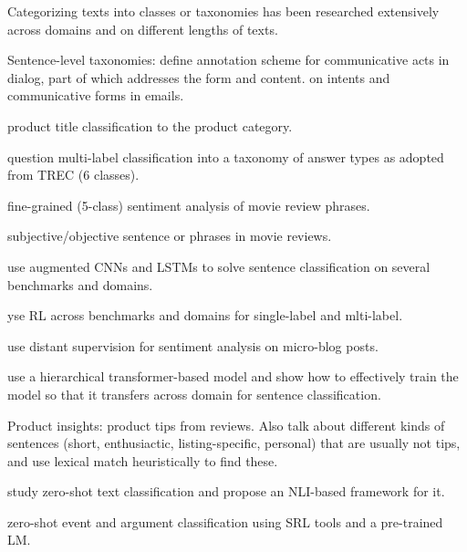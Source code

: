 

Categorizing texts into classes or taxonomies has been researched extensively across domains and on different lengths of texts.

Sentence-level taxonomies:
\citep{core1997dialog_annotation, jurafsky1997discourse_structure} define annotation scheme for communicative acts in dialog, part of which addresses the form and content. \citep{khoo2006email_classification} on intents and communicative forms in emails.

\citep{yu2012product_title_categories} product title classification to the product category.

\citep{li2002question_classification} question multi-label classification into a taxonomy of answer types as adopted from TREC (6 classes).

\citep[SST][]{socher2013finegrained_sentiment} fine-grained (5-class) sentiment analysis of movie review phrases.

\citep{pang2004subjective_reviews} subjective/objective sentence or phrases in movie reviews.

\citep{guo2019sentence_classification_dl} use augmented CNNs and LSTMs to solve sentence classification on several benchmarks and domains.

\citep{chai2020rl_classification} yse RL across benchmarks and domains for single-label and mlti-label.

\citep{go2009sentiment_distant} use distant supervision for sentiment analysis on micro-blog posts.

\citep{Brack2022classification_transfer} use a hierarchical transformer-based \citep{beltagy2019scibert} model and show how to effectively train the model so that it transfers across domain for sentence classification.

Product insights:
\citep{hirsch2021producttips} product tips from reviews. Also talk about different kinds of sentences (short, enthusiactic, listing-specific, personal) that are usually not tips, and use lexical match heuristically to find these.


\citep{yin2019zeroshot_classification} study zero-shot text classification and propose an NLI-based framework for it.

\citep{zhang2021zeroshot_classification} zero-shot event and argument classification using SRL tools and a pre-trained LM.

